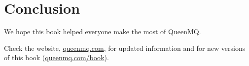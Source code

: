 
\chapter*{Conclusion}

We hope this book helped everyone make the most of QueenMQ.

Check the website, \href{https://queenmq.com}{queenmq.com}, for updated information and for new
versions of this book (\href{https://queenmq.com/book/}{queenmq.com/book}).
